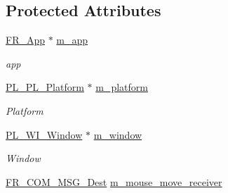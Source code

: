 \subsection*{Protected Attributes}
\begin{DoxyCompactItemize}
\item 
\hypertarget{classPlatform_1_1Input_1_1Input_a992c394546b9c6df860bd770cce4a902}{
\hyperlink{classFramework_1_1App}{FR\_\-App} $\ast$ \hyperlink{classPlatform_1_1Input_1_1Input_a992c394546b9c6df860bd770cce4a902}{m\_\-app}}
\label{classPlatform_1_1Input_1_1Input_a992c394546b9c6df860bd770cce4a902}

\begin{DoxyCompactList}\small\item\em app \item\end{DoxyCompactList}\item 
\hypertarget{classPlatform_1_1Input_1_1Input_a9ee29a227fdc277ff2197b6d86fbe963}{
\hyperlink{classPlatform_1_1Platform_1_1Platform}{PL\_\-PL\_\-Platform} $\ast$ \hyperlink{classPlatform_1_1Input_1_1Input_a9ee29a227fdc277ff2197b6d86fbe963}{m\_\-platform}}
\label{classPlatform_1_1Input_1_1Input_a9ee29a227fdc277ff2197b6d86fbe963}

\begin{DoxyCompactList}\small\item\em Platform \item\end{DoxyCompactList}\item 
\hypertarget{classPlatform_1_1Input_1_1Input_ad22b3cbd6768411e39342f60dd8f61b7}{
\hyperlink{classPlatform_1_1Window_1_1Window}{PL\_\-WI\_\-Window} $\ast$ \hyperlink{classPlatform_1_1Input_1_1Input_ad22b3cbd6768411e39342f60dd8f61b7}{m\_\-window}}
\label{classPlatform_1_1Input_1_1Input_ad22b3cbd6768411e39342f60dd8f61b7}

\begin{DoxyCompactList}\small\item\em Window \item\end{DoxyCompactList}\item 
\hypertarget{classPlatform_1_1Input_1_1Input_ad50cf4ca5fdf2d8f7e19432e975c4e1a}{
\hyperlink{structFramework_1_1Communication_1_1Message_1_1Dest}{FR\_\-COM\_\-MSG\_\-Dest} \hyperlink{classPlatform_1_1Input_1_1Input_ad50cf4ca5fdf2d8f7e19432e975c4e1a}{m\_\-mouse\_\-move\_\-receiver}}
\label{classPlatform_1_1Input_1_1Input_ad50cf4ca5fdf2d8f7e19432e975c4e1a}


\end{DoxyCompactItemize}

